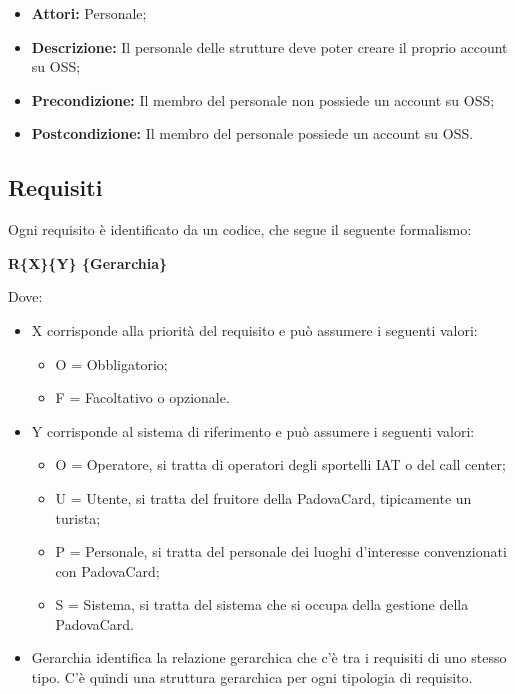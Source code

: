 \begin{itemize}
\item \textbf{Attori:} Personale;
\item \textbf{Descrizione:} Il personale delle strutture deve poter creare il proprio account su OSS;
\item \textbf{Precondizione:} Il membro del personale non possiede un account su OSS;
\item \textbf{Postcondizione:} Il membro del personale possiede un account su OSS.
\end{itemize}

\subsection{Requisiti}
Ogni requisito è identificato da un codice, che segue il seguente formalismo:

\begin{center}
\textbf{R\{X\}\{Y\} \{Gerarchia\}}
\end{center}

Dove:
\begin{itemize}
\item X corrisponde alla priorità del requisito e può assumere i seguenti valori:
	\begin{itemize}
		\item O = Obbligatorio;
        \item F = Facoltativo o opzionale.
	\end{itemize}
\item Y corrisponde al sistema di riferimento e può assumere i seguenti valori:
	\begin{itemize}
		\item O = Operatore, si tratta di operatori degli sportelli IAT o del call center;
        \item U = Utente, si tratta del fruitore della PadovaCard, tipicamente un turista;
        \item P = Personale, si tratta del personale dei luoghi d'interesse convenzionati con PadovaCard;
        \item S = Sistema, si tratta del sistema che si occupa della gestione della PadovaCard.
	\end{itemize}
\item Gerarchia identifica la relazione gerarchica che c'è tra i requisiti di uno stesso tipo. C'è quindi una struttura gerarchica per ogni tipologia di requisito.
\end{itemize}

